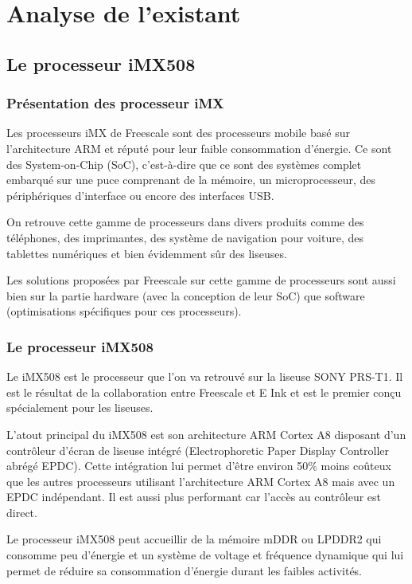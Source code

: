 \chapter{Analyse de l'existant}

\section{Le processeur iMX508}

\subsection{Présentation des processeur iMX}

Les processeurs iMX de Freescale sont des processeurs mobile basé sur l'architecture ARM et réputé pour leur faible consommation d'énergie. Ce sont des System-on-Chip (SoC), c'est-à-dire que ce sont des systèmes complet embarqué sur une puce comprenant de la mémoire, un microprocesseur, des périphériques d'interface ou encore des interfaces USB.

On retrouve cette gamme de processeurs dans divers produits comme des téléphones, des imprimantes, des système de navigation pour voiture, des tablettes numériques et bien évidemment sûr des liseuses.

Les solutions proposées par Freescale sur cette gamme de processeurs sont aussi bien sur la partie hardware (avec la conception de leur SoC) que software (optimisations spécifiques pour ces processeurs).

\subsection{Le processeur iMX508}

Le iMX508 est le processeur que l'on va retrouvé sur la liseuse SONY PRS-T1. Il est le résultat de la collaboration entre Freescale et E Ink et est le premier conçu spécialement pour les liseuses. 

L'atout principal du iMX508 est son architecture ARM Cortex A8 disposant d'un contrôleur d'écran de liseuse intégré (Electrophoretic Paper Display Controller abrégé EPDC). Cette intégration lui permet d'être environ 50\% moins coûteux que les autres processeurs utilisant l'architecture ARM Cortex A8 mais avec un EPDC indépendant. Il est aussi plus performant car l'accès au contrôleur est direct.

Le processeur iMX508 peut accueillir de la mémoire mDDR ou LPDDR2 qui consomme peu d'énergie et un système de voltage et fréquence dynamique qui lui permet de réduire sa consommation d'énergie durant les faibles activités.

